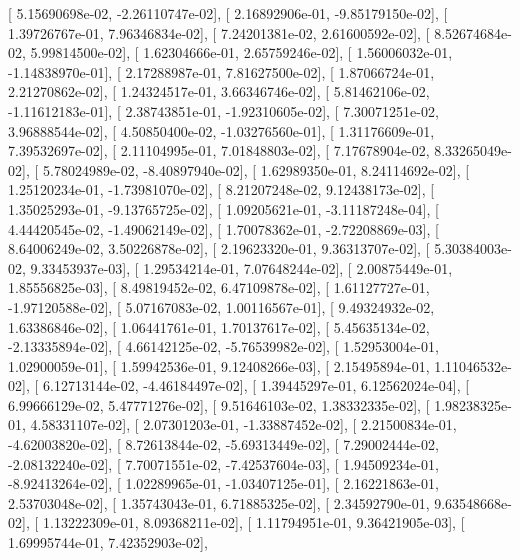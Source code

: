 \documentclass{article}
\begin{document}
       [  5.15690698e-02,  -2.26110747e-02],
       [  2.16892906e-01,  -9.85179150e-02],
       [  1.39726767e-01,   7.96346834e-02],
       [  7.24201381e-02,   2.61600592e-02],
       [  8.52674684e-02,   5.99814500e-02],
       [  1.62304666e-01,   2.65759246e-02],
       [  1.56006032e-01,  -1.14838970e-01],
       [  2.17288987e-01,   7.81627500e-02],
       [  1.87066724e-01,   2.21270862e-02],
       [  1.24324517e-01,   3.66346746e-02],
       [  5.81462106e-02,  -1.11612183e-01],
       [  2.38743851e-01,  -1.92310605e-02],
       [  7.30071251e-02,   3.96888544e-02],
       [  4.50850400e-02,  -1.03276560e-01],
       [  1.31176609e-01,   7.39532697e-02],
       [  2.11104995e-01,   7.01848803e-02],
       [  7.17678904e-02,   8.33265049e-02],
       [  5.78024989e-02,  -8.40897940e-02],
       [  1.62989350e-01,   8.24114692e-02],
       [  1.25120234e-01,  -1.73981070e-02],
       [  8.21207248e-02,   9.12438173e-02],
       [  1.35025293e-01,  -9.13765725e-02],
       [  1.09205621e-01,  -3.11187248e-04],
       [  4.44420545e-02,  -1.49062149e-02],
       [  1.70078362e-01,  -2.72208869e-03],
       [  8.64006249e-02,   3.50226878e-02],
       [  2.19623320e-01,   9.36313707e-02],
       [  5.30384003e-02,   9.33453937e-03],
       [  1.29534214e-01,   7.07648244e-02],
       [  2.00875449e-01,   1.85556825e-03],
       [  8.49819452e-02,   6.47109878e-02],
       [  1.61127727e-01,  -1.97120588e-02],
       [  5.07167083e-02,   1.00116567e-01],
       [  9.49324932e-02,   1.63386846e-02],
       [  1.06441761e-01,   1.70137617e-02],
       [  5.45635134e-02,  -2.13335894e-02],
       [  4.66142125e-02,  -5.76539982e-02],
       [  1.52953004e-01,   1.02900059e-01],
       [  1.59942536e-01,   9.12408266e-03],
       [  2.15495894e-01,   1.11046532e-02],
       [  6.12713144e-02,  -4.46184497e-02],
       [  1.39445297e-01,   6.12562024e-04],
       [  6.99666129e-02,   5.47771276e-02],
       [  9.51646103e-02,   1.38332335e-02],
       [  1.98238325e-01,   4.58331107e-02],
       [  2.07301203e-01,  -1.33887452e-02],
       [  2.21500834e-01,  -4.62003820e-02],
       [  8.72613844e-02,  -5.69313449e-02],
       [  7.29002444e-02,  -2.08132240e-02],
       [  7.70071551e-02,  -7.42537604e-03],
       [  1.94509234e-01,  -8.92413264e-02],
       [  1.02289965e-01,  -1.03407125e-01],
       [  2.16221863e-01,   2.53703048e-02],
       [  1.35743043e-01,   6.71885325e-02],
       [  2.34592790e-01,   9.63548668e-02],
       [  1.13222309e-01,   8.09368211e-02],
       [  1.11794951e-01,   9.36421905e-03],
       [  1.69995744e-01,   7.42352903e-02],
\end{document}
